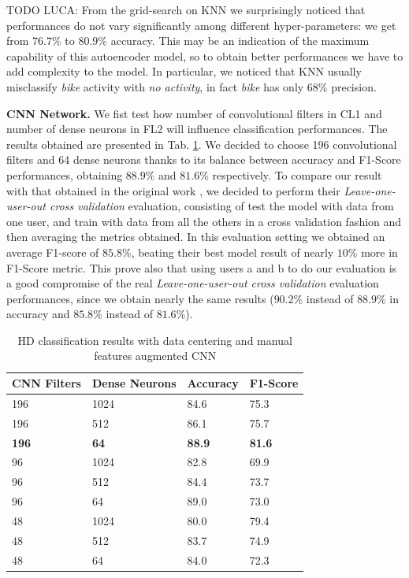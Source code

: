 TODO LUCA: From the grid-search on KNN we surprisingly noticed that performances
do not vary significantly among different hyper-parameters: we get from
$76.7$\% to $80.9$\% accuracy. This may be an indication of the
maximum capability of this autoencoder model, so to obtain better
performances we have to add complexity to the model. In particular, we
noticed that KNN usually misclassify \textit{bike} activity with
\textit{no activity}, in fact \textit{bike} has only
$68$\% precision.

\textbf{CNN Network.} We fist test how number of convolutional filters in CL1 and number of dense neurons in FL2 will influence classification performances. The results obtained are presented in Tab. \ref{tab:model-selection}. We decided to choose 196 convolutional filters and 64 dense neurons thanks to its balance between accuracy and F1-Score performances, obtaining $88.9\%$ and $81.6\%$ respectively. To compare our result with that obtained in the original work \cite{stisen2015smart}, we decided to perform their \textit{Leave-one-user-out cross validation} evaluation, consisting of test the model with data from one user, and train with data from all the others in a cross validation fashion and then averaging the metrics obtained. In this evaluation setting we obtained an average F1-score of $85.8\%$, beating their best model result of nearly $10\%$ more in F1-Score metric. This prove also that using users a and b to do our evaluation is a good compromise of the real \textit{Leave-one-user-out cross validation} evaluation performances, since we obtain nearly the same results ($90.2\%$ instead of $88.9\%$ in accuracy and $85.8\%$ instead of $81.6\%$).

\begin{table}[h]
	\begin{center}
		\begin{tabular}{ p{1.8cm}p{1.7cm}p{1.7cm}p{1.7cm} }
			\hline
			CNN Filters & Dense Neurons & Accuracy & F1-Score \\
			\hline
			196 & 1024 & 84.6 & 75.3 \\
			196 & 512 & 86.1 & 75.7 \\
			\textbf{196} & \textbf{64} & \textbf{88.9} & \textbf{81.6} \\
			96 & 1024 & 82.8 & 69.9 \\
			96 & 512 & 84.4 & 73.7 \\
			96 & 64 & 89.0 & 73.0 \\
			48 & 1024 & 80.0 & 79.4 \\
			48 & 512 & 83.7 & 74.9 \\
			48 & 64 & 84.0 & 72.3 \\
			\hline
		\end{tabular}
		\caption{\label{tab:model-selection} HD classification results with data centering and manual features augmented CNN}
	\end{center}
\end{table}


